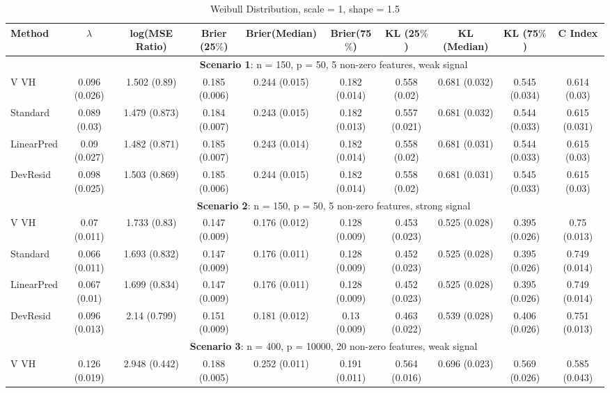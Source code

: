 \documentclass{article}
\begin{document}
\begin{landscape}
\begin{table}[h]
\setlength{\tabcolsep}{3pt}
\caption{\label{Tab:wb2} Weibull Distribution, scale = 1, shape = 1.5}
\centering
\begin{tabular}[t]{lccccccccc}
\toprule
 Method & $\lambda$ & log(MSE Ratio) & Brier (25$\%$) & Brier(Median) & Brier(75$\%$) & KL (25$\%$)& KL (Median) & KL (75$\%$) & C Index\\
\midrule
&\multicolumn{9}{c}{\textbf{Scenario 1}: n = 150, p = 50, 5 non-zero features, weak signal}\\
\cline{2-10}
V VH  & 0.096 (0.026) & 1.502 (0.89) & 0.185 (0.006) & 0.244 (0.015) & 0.182 (0.014) & 0.558 (0.02) & 0.681 (0.032) & 0.545 (0.034) & 0.614 (0.03) \\
Standard  & 0.089 (0.03) & 1.479 (0.873) & 0.184 (0.007) & 0.243 (0.015) & 0.182 (0.013) & 0.557 (0.021) & 0.681 (0.032) & 0.544 (0.033) & 0.615 (0.031) \\
LinearPred  & 0.09 (0.027) & 1.482 (0.871) & 0.185 (0.007) & 0.243 (0.014) & 0.182 (0.014) & 0.558 (0.02) & 0.681 (0.031) & 0.544 (0.033) & 0.615 (0.03) \\
DevResid  & 0.098 (0.025) & 1.503 (0.869) & 0.185 (0.006) & 0.244 (0.015) & 0.182 (0.014) & 0.558 (0.02) & 0.681 (0.031) & 0.545 (0.033) & 0.615 (0.03) \\
\addlinespace
&\multicolumn{9}{c}{\textbf{Scenario 2}: n = 150, p = 50, 5 non-zero features, strong signal}\\
\cline{2-10}
 V VH  & 0.07 (0.011) & 1.733 (0.83) & 0.147 (0.009) & 0.176 (0.012) & 0.128 (0.009) & 0.453 (0.023) & 0.525 (0.028) & 0.395 (0.026) & 0.75 (0.013) \\ 
Standard  & 0.066 (0.011) & 1.693 (0.832) & 0.147 (0.009) & 0.176 (0.011) & 0.128 (0.009) & 0.452 (0.023) & 0.525 (0.028) & 0.395 (0.026) & 0.749 (0.014) \\
 LinearPred  & 0.067 (0.01) & 1.699 (0.834) & 0.147 (0.009) & 0.176 (0.011) & 0.128 (0.009) & 0.452 (0.023) & 0.525 (0.028) & 0.395 (0.026) & 0.749 (0.014) \\
 DevResid  & 0.096 (0.013) & 2.14 (0.799) & 0.151 (0.009) & 0.181 (0.012) & 0.13 (0.009) & 0.463 (0.022) & 0.539 (0.028) & 0.406 (0.026) & 0.751 (0.013) \\
\addlinespace
&\multicolumn{9}{c}{\textbf{Scenario 3}: n = 400, p = 10000, 20 non-zero features, weak signal}\\
\cline{2-10}
V VH  & 0.126 (0.019) & 2.948 (0.442) & 0.188 (0.005) & 0.252 (0.011) & 0.191 (0.011) & 0.564 (0.016) & 0.696 (0.023) & 0.569 (0.026) & 0.585 (0.043) \\ 

\end{tabular}
\end{table}
\end{landscape}
\end{document}
